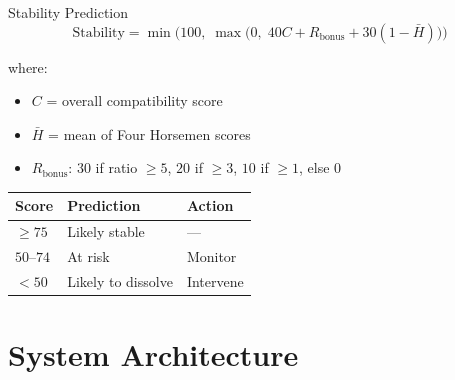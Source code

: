 \documentclass[aspectratio=169, 11pt]{beamer}
\begin{document}
\begin{frame}{Stability Prediction}
\[
\text{Stability} = \min\!\bigg(100,\; \max\!\Big(0,\; 40C + R_{\text{bonus}} + 30(1 - \bar{H})\Big)\bigg)
\]

where:
\begin{itemize}
    \item $C$ = overall compatibility score
    \item $\bar{H}$ = mean of Four Horsemen scores
    \item $R_{\text{bonus}}$: $30$ if ratio $\geq 5$, $20$ if $\geq 3$, $10$ if $\geq 1$, else $0$
\end{itemize}

\vspace{1em}
\begin{tabular}{@{}lll@{}}
\toprule
\textbf{Score} & \textbf{Prediction} & \textbf{Action} \\
\midrule
$\geq 75$ & Likely stable & --- \\
$50$--$74$ & At risk & Monitor \\
$< 50$ & Likely to dissolve & Intervene \\
\bottomrule
\end{tabular}
\end{frame}

\section{System Architecture}
\end{document}

